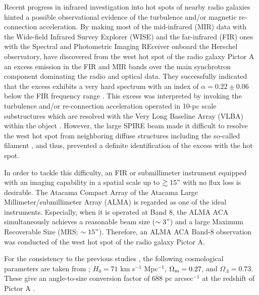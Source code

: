 \documentclass[twocolumn]{aastex631}
\begin{document}
Recent progress in infrared investigation into hot spots 
of nearby radio galaxies \citep{isobe2017,isobe2020,sunada2022}
hinted a possible observational evidence 
of the turbulence and/or magnetic re-connection acceleration. 
By making most of the mid-infrared (MIR) data 
with the Wide-ﬁeld Infrared Survey Explorer (WISE) 
and the far-infrared (FIR) ones with 
the Spectral and Photometric Imaging REceiver  
\citep[SPIRE;][]{griffin2010} 
onboard the Herschel observatory,
\citet{isobe2017,isobe2020} have discovered 
from the west hot spot of the radio galaxy Pictor A
an excess emission in the FIR and MIR bands
over the main synchrotron component dominating the radio and optical data.
They successfully indicated that the excess exhibits 
a very hard spectrum with an index of $\alpha = 0.22 \pm 0.06$ 
below the FIR frequency range \citep{isobe2020}.
This excess was interpreted by invoking  
the turbulence and/or re-connection acceleration 
operated in 10-pc scale substructures  
which are resolved with the Very Long Baseline Array (VLBA) 
within the object \citep{tingay2008}.
However, the large SPIRE beam 
\citep[$17.6"$ for the PSW array at the wavelength of $250$ $\mu$m;][]{griffin2013}
made it difficult to resolve the west hot spot from neighboring diffuse structures 
including the so-called filament \citep{Roser1987},
and thus, 
prevented a definite identification of the excess with the hot spot.


In order to tackle this difficulty,
an FIR or submillimeter instrument
equipped with an imaging capability 
in a spatial scale up to $\gtrsim 15"$ 
with no flux loss 
is desirable. 
The Atacama Compact Array \citep[ACA;][]{iguchi2009}
of the Atacama Large Millimeter/submillimeter Array (ALMA) 
is regarded as one of the ideal instruments. 
Especially, when it is operated at Band 8, 
the ALMA ACA simultaneously achieves a reasonable beam size ($\sim3"$)
and a large Maximum Recoverable Size (MRS; $\sim 15"$).
Therefore, an ALMA ACA Band-8 observation was conducted 
of the west hot spot of the radio galaxy Pictor A.

For the consistency to the previous studies \citep{tingay2008,isobe2017,isobe2020},
the following cosmological parameters are taken from \citet{spergel2003};
$H_0 = 71$ km s$^{-1}$ Mpc$^{-1}$, $\Omega_{\rm m} = 0.27$, 
and $\Omega_{\Lambda} = 0.73$. 
These give an angle-to-size conversion factor of $688$ pc arcsec$^{-1}$ 
at the redshift of Pictor A \citep[$z=0.035$;][]{eracleous2004}. 
\end{document}
